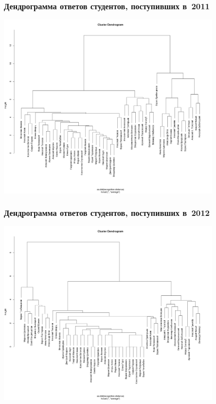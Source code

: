 \documentclass{beamer}
\begin{document}
\begin{frame}
\frametitle{Дендрограмма ответов студентов, поступивших в~2011}
\begin{center}
\includegraphics[width=0.85\textwidth]{clust1.png}
\end{center}
\end{frame}


\begin{frame}
\frametitle{Дендрограмма ответов студентов, поступивших в~2012}
\begin{center}
\includegraphics[width=0.85\textwidth]{clust2.png}
\end{center}
\end{frame}

\end{document}
